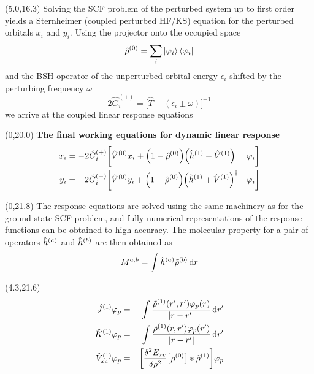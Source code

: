 \documentclass[a0,portrait]{a0poster}
\begin{document}
\begin{textblock}{4.3}(5.0,16.3)
Solving the SCF problem of the perturbed system up to first order yields a
Sternheimer\cite{Mahan} (coupled perturbed HF/KS) equation for the perturbed 
orbitals $x_i$ and $y_i$. Using the projector onto the occupied space
\begin{equation}
    \hat{\rho}^{(0)} = \sum_i \ket{\varphi_i}\bra{\varphi_i}
\end{equation}
and the BSH operator of the unperturbed orbital energy $\epsilon_i$ shifted by 
the perturbing frequency $\omega$
\begin{equation}
    2\hat{G}_i^{(\pm)} = \Big[\hat{T} - (\epsilon_i \pm \omega)\Big]^{-1} 
\end{equation}
we arrive at the coupled linear response equations\cite{Sekino,Yanai}
\end{textblock}

\begin{textblock}{9.3}(0,20.0)
\centering
\textbf{The final working equations for dynamic linear response}
\begin{eqnarray}
    \label{eq:x}
    x_i = -2 \hat{G}_i^{(+)}\bigg[
    &\hat{V}^{(0)}x_i +
    \Big(1 - \hat{\rho}^{(0)}\Big)
    \Big(\hat{h}^{(1)} + \hat{V}^{(1)}\Big)&\varphi_i\bigg]\\
    \label{eq:y}
    y_i = -2 \hat{G}_i^{(-)}\bigg[
    &\hat{V}^{(0)}y_i +
    \Big(1 - \hat{\rho}^{(0)}\Big)
    \Big(\hat{h}^{(1)} + \hat{V}^{(1)}\Big)^\dag&\varphi_i\bigg]
\end{eqnarray}
\end{textblock}

\begin{textblock}{4.3}(0,21.8)
The response equations are solved using the same machinery as for the 
ground-state SCF problem, and fully numerical representations of the response
functions can be obtained to high accuracy. 
The molecular property for a pair of operators 
$\hat{h}^{(a)}$ and $\hat{h}^{(b)}$ are then obtained as
\begin{equation}
    M^{a,b} = \int \hat{h}^{(a)}\tilde{\rho}^{(b)} \,\mathrm{d} r
\end{equation}
\end{textblock}

\begin{textblock}{5.0}(4.3,21.6)
\begin{eqnarray}
    \hat{J}^{(1)} \varphi_p &=& 
        \int\frac{\tilde{\rho}^{(1)}(r',r')\varphi_p(r)}{|r-r'|} \,\mathrm{d} r' \\
    \hat{K}^{(1)} \varphi_p &=&
        \int\frac{\tilde{\rho}^{(1)}(r,r')\varphi_p(r')}{|r-r'|} \,\mathrm{d} r' \\
    \hat{V}_{xc}^{(1)} \varphi_p &=& 
        \bigg[\frac{\delta^2 E_{xc}}{\delta \rho^2}
        \big[\rho^{(0)}\big]*\tilde{\rho}^{(1)}\bigg] \varphi_p
\end{eqnarray}
\end{textblock}
\end{document}

